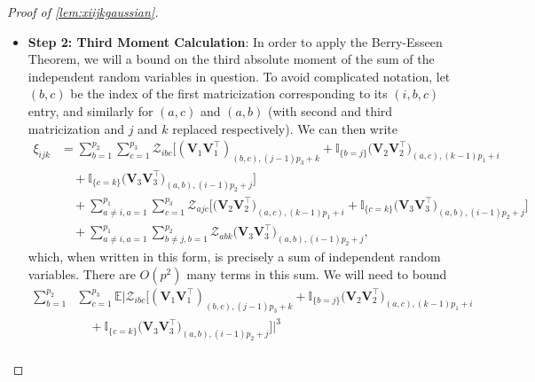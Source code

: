 \documentclass[10pt]{article}
\newcommand{\0}{{\mathbf{0}}}
\newcommand{\1}{{\mathbf{1}}}
\newcommand{\E}{{\mathbf{E}}}
\newcommand{\var}{{\rm var}}
\renewcommand{\t}{^{\top}}
\renewcommand{\E}{\mathbb{E}}
\begin{document}
\begin{proof}[Proof of \cref{lem:xiijkgaussian}]
\begin{itemize}
which will be useful later on.
\item 
\textbf{Step 2: Third Moment Calculation}: 
In order to apply the Berry-Esseen Theorem, we will a bound on the third absolute moment of the sum of the independent random variables in question.  To avoid complicated notation, let $(b,c)$ be the index of the first matricization corresponding to its $(i,b,c)$ entry, and similarly for $(a,c)$ and $(a,b)$ (with second and third matricization and $j$ and $k$ replaced respectively).  We can then write
\begin{align*}
    \xi_{ijk} &= \sum_{b=1}^{p_2} \sum_{c=1}^{p_3} \mathcal{Z}_{ibc}\bigg[ (\mathbf{V}_1 \mathbf{V}_1\t)_{(b,c),(j-1)p_3 + k}  + \mathbb{I}_{\{b=j\}} \big( \mathbf{V}_2 \mathbf{V}_2\t \big)_{(a,c),(k-1)p_1 + i} \\
    &\quad + \mathbb{I}_{\{c = k \}} \big( \mathbf{V}_3 \mathbf{V}_3\t \big)_{(a,b),(i-1)p_2 + j} \bigg] \\
    &\quad + \sum_{a\neq i, a=1}^{p_1} \sum_{c=1}^{p_3} \mathcal{Z}_{ajc} \bigg[ \big(\mathbf{V}_2 \mathbf{V}_2\t \big)_{(a,c),(k-1)p_1 + i} + \mathbb{I}_{\{c = k \}} \big( \mathbf{V}_3 \mathbf{V}_3\t \big)_{(a,b),(i-1)p_2 + j} \bigg] \\
    &\quad + \sum_{a\neq i, a=1}^{p_1} \sum_{b\neq j, b=1}^{p_2} \mathcal{Z}_{abk} \big( \mathbf{V}_3 \mathbf{V}_3\t \big)_{(a,b),(i-1)p_2+j},
\end{align*}
which, when written in this form, is precisely a sum of independent random variables. There are $O(p^2)$ many terms in this sum.  We will need to bound
\begin{align}
    \sum_{b=1}^{p_2}& \sum_{c=1}^{p_3}\E \bigg| \mathcal{Z}_{ibc}\bigg[ (\mathbf{V}_1 \mathbf{V}_1\t)_{(b,c),(j-1)p_3 + k}  + \mathbb{I}_{\{b=j\}} \big( \mathbf{V}_2 \mathbf{V}_2\t \big)_{(a,c),(k-1)p_1 + i} \\
    &\quad + \mathbb{I}_{\{c = k \}} \big( \mathbf{V}_3 \mathbf{V}_3\t \big)_{(a,b),(i-1)p_2 + j} \bigg]\bigg|^3 \nonumber \\

\end{align}
\end{itemize}
\end{proof}
\end{document}
